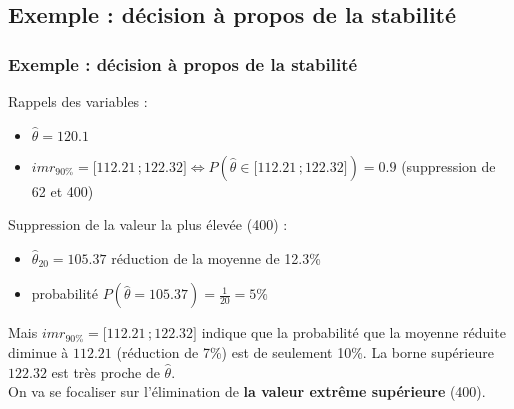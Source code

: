 \documentclass[handout]{beamer}
\newcommand{\intervalleff}[2]{\mathopen{[}#1\,;#2\mathclose{]}}
\begin{document}
		\subsection{Exemple : décision à propos de la stabilité}
		\begin{frame}
			\frametitle{Exemple : décision à propos de la stabilité}
			Rappels des variables :
			\begin{itemize}
				\item $\hat{\theta} = 120.1 $
				\item $imr_{90 \%} = \intervalleff{112.21}{122.32} \Leftrightarrow P(\hat{\theta} \in \intervalleff{112.21}{122.32}) = 0.9$ (suppression de 62 et 400)
			\end{itemize}

			\vspace{10px}
			Suppression de la valeur la plus élevée (400) :
			\begin{itemize}
				\item $\hat{\theta}_{20} = 105.37 $ réduction de la moyenne de 12.3\%
				\item probabilité $P(\hat{\theta} = 105.37) = \frac{1}{20} = 5 \%$
			\end{itemize}

			\vspace{10px}
			Mais $imr_{90 \%} = \intervalleff{112.21}{122.32}$ indique que la probabilité que la moyenne réduite diminue à $112.21$ (réduction de 7\%) est de seulement 10\%. La borne supérieure $122.32$ est très proche de $\hat{\theta}$.\\

			\vspace{10px}
			On va se focaliser sur l'élimination de \textbf{la valeur extrême supérieure} (400).
		\end{frame}
\end{document}
